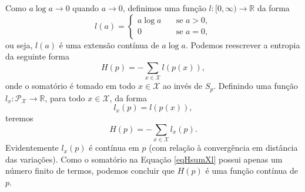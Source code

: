 \begin{frame}[allowframebreaks]
  Como $a \log a \rightarrow 0$ quando $a \rightarrow 0$, definimos uma função 
  $l:[0,\infty) \rightarrow \mathbb{R}$ da forma
  \begin{equation}
  l(a) = \begin{cases} 
        a\log a & \quad \text{se } a > 0 , \\
        0       & \quad \text{se } a = 0 ,
        \end{cases}
  \end{equation}
  ou seja, $l(a)$ é uma extensão contínua de $a \log a$.
  Podemos reescrever a entropia da seguinte forma
  \begin{equation}
  H(p) = - \sum_{x \in \mathcal{X}} l(p(x)) ,
  \end{equation}
  onde o somatório é tomado em todo $x \in \mathcal{X}$ ao invés de $S_p$.
  Definindo uma função $l_x: \mathcal{P}_\mathcal{X} \rightarrow \mathbb{R}$, para
  todo $x \in \mathcal{X}$, da forma 
  \begin{equation}
  l_x(p) = l(p(x)) ,
  \end{equation}
  teremos
  \begin{equation}
  H(p) = - \sum_{x \in \mathcal{X}} l_x(p) . \label{eqHsumXl}
  \end{equation}
  Evidentemente $l_x(p)$ é contínua em $p$ (com relação à convergência em 
  distância das variações). Como o somatório na Equação \ref{eqHsumXl} possui
  apenas um número finito de termos, podemos concluir que $H(p)$ é uma função
  contínua de $p$.
\end{frame}


